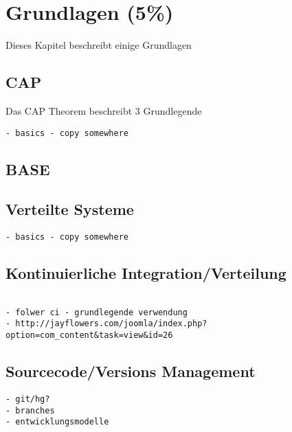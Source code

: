 \chapter{Grundlagen (5\%)}

Dieses Kapitel beschreibt einige Grundlagen

\section{CAP}
\label{sec:base:cap}



Das CAP Theorem beschreibt 3 Grundlegende

\begin{verbatim}
- basics - copy somewhere
\end{verbatim}

\section{BASE}

\section{Verteilte Systeme}

\begin{verbatim}
- basics - copy somewhere
\end{verbatim}

\section{Kontinuierliche Integration/Verteilung}
\label{sec:base:ci}
\begin{verbatim}

- folwer ci - grundlegende verwendung
- http://jayflowers.com/joomla/index.php?option=com_content&task=view&id=26
\end{verbatim}

\section{Sourcecode/Versions Management}

\begin{verbatim}
- git/hg?
- branches
- entwicklungsmodelle
\end{verbatim}
